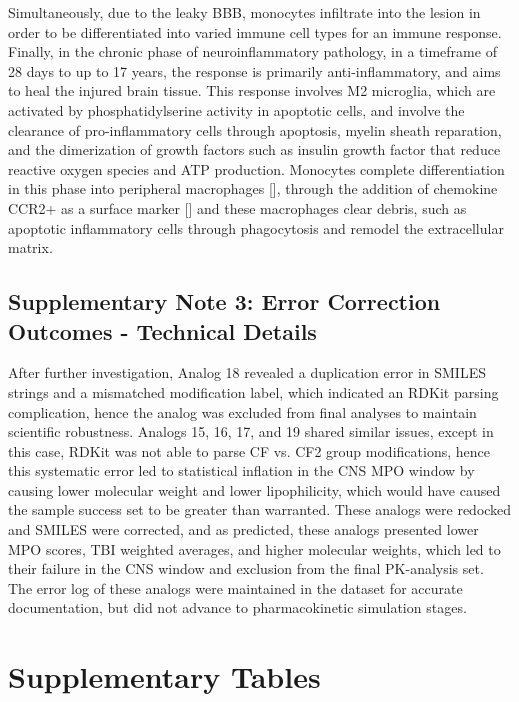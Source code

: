 \documentclass[times, twoside]{zHenriquesLab-StyleBioRxiv}
\begin{document}
		Simultaneously, due to the leaky BBB, monocytes infiltrate into the lesion in order to be differentiated into varied immune cell types for an immune response. 
		Finally, in the chronic phase of neuroinflammatory pathology, in a timeframe of 28 days to up to 17 years, the response is primarily anti-inflammatory, and aims to heal the injured brain tissue. 
		This response involves M2 microglia, which are activated by phosphatidylserine activity in apoptotic cells, and involve the clearance of pro-inflammatory cells through apoptosis, myelin sheath reparation, and the dimerization of growth factors such as insulin growth factor that reduce reactive oxygen species and ATP production. 
		Monocytes complete differentiation in this phase into peripheral macrophages [\cite{hsieh2013}], through the addition of chemokine CCR2+ as a surface marker [\cite{semple2010}] and these macrophages clear debris, such as apoptotic inflammatory cells through phagocytosis and remodel the extracellular matrix.
		
		\subsection{Supplementary Note 3: Error Correction Outcomes - Technical Details}
		
		After further investigation, Analog 18 revealed a duplication error in SMILES strings and a mismatched modification label, which indicated an RDKit parsing complication, hence the analog was excluded from final analyses to maintain scientific robustness. Analogs 15, 16, 17, and 19 shared similar issues, except in this case, RDKit was not able to parse CF vs. CF2 group modifications, hence this systematic error led to statistical inflation in the CNS MPO window by causing lower molecular weight and lower lipophilicity, which would have caused the sample success set to be greater than warranted. These analogs were redocked and SMILES were corrected, and as predicted, these analogs presented lower MPO scores, TBI weighted averages, and higher molecular weights, which led to their failure in the CNS window and exclusion from the final PK-analysis set. The error log of these analogs were maintained in the dataset for accurate documentation, but did not advance to pharmacokinetic simulation stages.
		
	\section*{Supplementary Tables}
	
\end{document}
